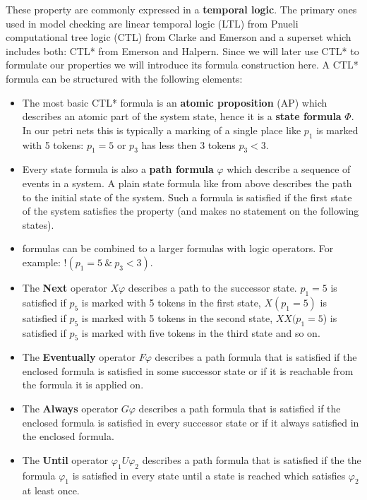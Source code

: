 These property are commonly expressed in a \textbf{temporal logic}.
The primary ones used in model checking are linear temporal logic (LTL) from Pnueli\cite{pnueli1977temporal} computational tree logic (CTL) from Clarke and Emerson\cite{clarke1981design} and a superset which includes both: CTL* from Emerson and Halpern\cite{emerson1985decision}.
Since we will later use CTL* to formulate our properties we will introduce its formula construction here.
A CTL* formula can be structured with the following elements:
\begin{itemize}
  \item The most basic CTL* formula is an \textbf{atomic proposition} (AP) which describes an atomic part of the system state, hence it is a \textbf{state formula} $\Phi$. 
  In our petri nets this is typically a marking of a single place like $p_1$ is marked with 5 tokens: $p_1=5$ or $p_3$ has less then 3 tokens $p_3<3$.
  \item Every state formula is also a \textbf{path formula} $\varphi$ which describe a sequence of events in a system.
  A plain state formula like from above describes the path to the initial state of the system. Such a formula is satisfied if the first state of the system satisfies the property (and makes no statement on the following states).
  \item formulas can be combined to a larger formulas with logic operators. For example: $!(p_1=5\ \&\ p_3<3)$.
  \item The \textbf{Next} operator $X\varphi$ describes a path to the successor state. 
  $p_1=5$ is satisfied if $p_5$ is marked with 5 tokens in the first state, $X(p_1=5)$ is satisfied if $p_5$ is marked with 5 tokens in the second state, $XX(p_1=5$) is satisfied if $p_5$ is marked with five tokens in the third state and so on.
  \item The \textbf{Eventually} operator $F\varphi$ describes a path formula that is satisfied if the enclosed formula is satisfied in some successor state or if it is reachable from the formula it is applied on.
  \item The \textbf{Always} operator $G\varphi$ describes a path formula that is satisfied if the enclosed formula is satisfied in every successor state or if it always satisfied in the enclosed formula.
  \item The \textbf{Until} operator $\varphi_1 U\varphi_2$ describes a path formula that is satisfied if the the formula $\varphi_1$ is satisfied in every state until a state is reached which satisfies $\varphi_2$ at least once.

\end{itemize}
